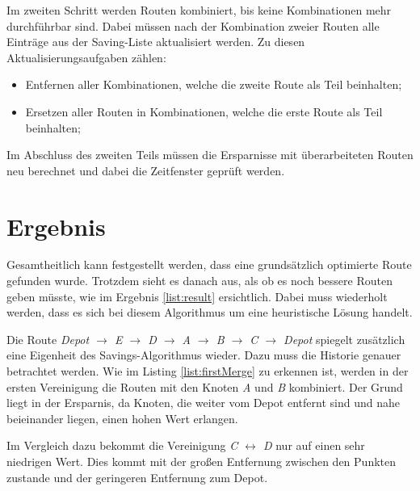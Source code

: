 \noindent
Im zweiten Schritt werden Routen kombiniert, bis keine Kombinationen mehr durchführbar sind. 
Dabei müssen nach der Kombination zweier Routen alle Einträge aus der Saving-Liste aktualisiert werden.
Zu diesen Aktualisierungsaufgaben zählen:
\begin{itemize}
	\item Entfernen aller Kombinationen, welche die zweite Route als Teil beinhalten;
	\item Ersetzen aller Routen in Kombinationen, welche die erste Route als Teil beinhalten;
\end{itemize}
Im Abschluss des zweiten Teils müssen die Ersparnisse mit überarbeiteten Routen neu berechnet und dabei die Zeitfenster geprüft werden. 


\section{Ergebnis}

Gesamtheitlich kann festgestellt werden, dass eine grundsätzlich optimierte Route gefunden wurde. 
Trotzdem sieht es danach aus, als ob es noch bessere Routen geben müsste, wie im Ergebnis \ref{list:result} ersichtlich. 
Dabei muss wiederholt werden, dass es sich bei diesem Algorithmus um eine heuristische Lösung handelt. 


\noindent
Die Route \textit{Depot $\rightarrow$ E $\rightarrow$ D $\rightarrow$ A $\rightarrow$ B $\rightarrow$ C $\rightarrow$ Depot} spiegelt zusätzlich eine Eigenheit des Savings-Algorithmus wieder. 
Dazu muss die Historie genauer betrachtet werden. 
Wie im Listing \ref{list:firstMerge} zu erkennen ist, werden in der ersten Vereinigung die Routen mit den Knoten \textit{A} und \textit{B} kombiniert. 
Der Grund liegt in der Ersparnis, da Knoten, die weiter vom Depot entfernt sind und nahe beieinander liegen, einen hohen Wert erlangen. 

Im Vergleich dazu bekommt die Vereinigung \textit{C $\leftrightarrow$ D} nur auf einen sehr niedrigen Wert. 
Dies kommt mit der großen Entfernung zwischen den Punkten zustande und der geringeren Entfernung zum Depot. 

